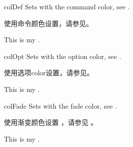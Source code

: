 % 
% 
% 
% 
% 
% 
% 
% 
% 
% 
% 
% 
% 
% 


\begin{docCommand}{colDef}{}
Sets  with the command color, see .

使用命令颜色设置，请参见。
\begin{dispExample}
This is my .
\end{dispExample}
\end{docCommand}

\begin{docCommand}{colOpt}{}
Sets  with the option color, see .

使用选项color设置，请参见。
\begin{dispExample}
This is my .
\end{dispExample}
\end{docCommand}


\begin{docCommand}[doc new=2019-09-18]{colFade}{}
Sets  with the fade color, see .

使用渐变颜色设置 ，请参见 。
\begin{dispExample}
This is my .
\end{dispExample}
\end{docCommand}


